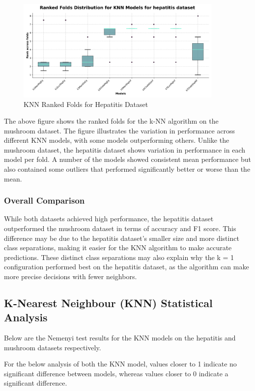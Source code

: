 \begin{figure}
    \centering
    \includegraphics[width=0.9\textwidth]{figures/ranked_folds_KNN_hepatitis.png}
    \caption{KNN Ranked Folds for Hepatitis Dataset}
    \label{fig:ranked_folds_KNN_hepatitis}
\end{figure}

The above figure shows the ranked folds for the k-NN algorithm on the mushroom dataset.
The figure illustrates the variation in performance across different KNN models, with some models outperforming others.
Unlike the mushroom dataset, the hepatitis dataset shows variation in performance in each model per fold.
A number of the models showed consistent mean performance but also contained some outliers that performed significantly better or worse
than the mean.


\subsubsection{Overall Comparison}
While both datasets achieved high performance, the hepatitis dataset outperformed the mushroom dataset in terms of accuracy and F1 score.
This difference may be due to the hepatitis dataset's smaller size and more distinct class separations,
making it easier for the KNN algorithm to make accurate predictions. These distinct class separations may also explain why the k = 1 configuration
performed best on the hepatitis dataset, as the algorithm can make more precise decisions with fewer neighbors.

\subsection*{K-Nearest Neighbour (KNN) Statistical Analysis}
Below are the Nemenyi test results for the KNN models on the hepatitis and mushroom datasets respectively.

For the below analysis of both the KNN model, values closer to 1 indicate no significant difference between models,
whereas values closer to 0 indicate a significant difference.

